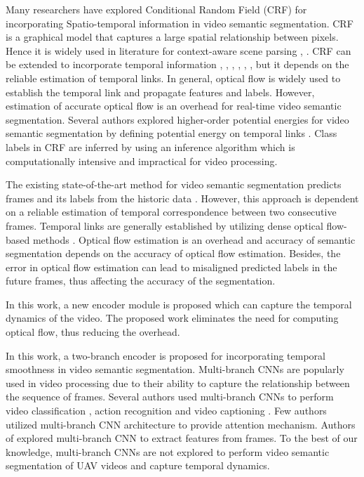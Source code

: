 \documentclass[journal]{IEEEtran}
\begin{document}
Many researchers have explored Conditional Random Field (CRF) for incorporating Spatio-temporal information in video semantic segmentation. CRF is a graphical model that captures a large spatial relationship between pixels.  Hence it is widely used in literature for context-aware scene parsing \cite{3}, \cite{6}. CRF can be extended to incorporate temporal information \cite{5}, \cite{6}, \cite{8}, \cite{9}, \cite{10}, \cite{11}, \cite{12} but it depends on the reliable estimation of temporal links. In general, optical flow is widely used to establish the temporal link and propagate features and labels. However, estimation of accurate optical flow is an overhead for real-time video semantic segmentation. Several authors explored higher-order potential energies for video semantic segmentation by defining potential energy on temporal links \cite{6}. Class labels in CRF are inferred by using an inference algorithm which is computationally intensive and impractical for video processing.


\par The existing state-of-the-art method for video semantic segmentation predicts frames and its labels from the historic data \cite{22}. However, this approach is dependent on a reliable estimation of temporal correspondence between two consecutive frames. Temporal links are generally established by utilizing dense optical flow-based methods \cite{5}. Optical flow estimation is an overhead and accuracy of semantic segmentation depends on the accuracy of optical flow estimation. Besides, the error in optical flow estimation can lead to misaligned predicted labels in the future frames, thus affecting the accuracy of the segmentation. 

\par In this work, a new encoder module is proposed which can capture the temporal dynamics of the video. The proposed work eliminates the need for computing optical flow, thus reducing the overhead. 



In this work, a two-branch encoder is proposed for incorporating temporal smoothness in video semantic segmentation. Multi-branch CNNs are popularly used in video processing due to their ability to capture the relationship between the sequence of frames. Several authors used multi-branch CNNs to perform video classification \cite{wang2018appearance}, action recognition \cite{peng2016multi} and video captioning \cite{yu2016video}. Few authors utilized multi-branch CNN architecture to provide attention mechanism. Authors of \cite{qiao2016deep} explored multi-branch CNN to extract features from frames. To the best of our knowledge, multi-branch CNNs are not explored to perform video semantic segmentation of UAV videos and capture temporal dynamics.  
\end{document}
